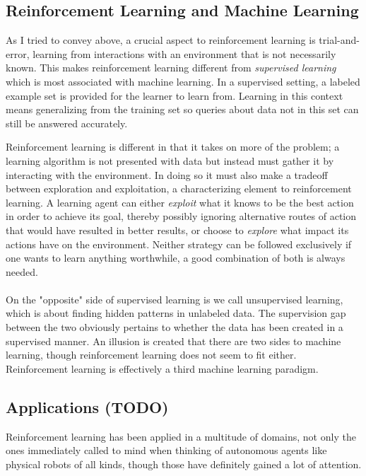 \subsection{Reinforcement Learning and Machine Learning}
As I tried to convey above,
a crucial aspect to reinforcement learning
is trial-and-error, learning from interactions
with an environment that is not necessarily known.
This makes reinforcement learning different from
\textit{supervised learning}
which is most associated with machine learning.
In a supervised setting,
a labeled example set is provided
for the learner to learn from.
Learning in this context means generalizing from the training set
so queries about data not in this set
can still be answered accurately.

Reinforcement learning is different
in that it takes on more of the problem;
a learning algorithm is not presented with data
but instead must gather it by interacting with the environment.
In doing so it must also make a tradeoff between exploration and exploitation,
a characterizing element to reinforcement learning.
A learning agent can either \textit{exploit}
what it knows to be the best action in order to achieve its goal,
thereby possibly ignoring alternative routes of action
that would have resulted in better results,
or choose to \textit{explore}
what impact its actions have on the environment.
Neither strategy can be followed exclusively
if one wants to learn anything worthwhile,
a good combination of both is always needed.

\paragraph{}
On the "opposite" side of supervised learning
is we call unsupervised learning,
which is about finding hidden patterns in unlabeled data.
The supervision gap between the two obviously pertains
to whether the data has been created in a supervised manner.
An illusion is created that there are two sides to machine learning,
though reinforcement learning does not seem to fit either.
Reinforcement learning is effectively a third machine learning paradigm.

\subsection{Applications (TODO)}
Reinforcement learning has been applied in a multitude of domains,
not only the ones immediately called to mind when thinking
of autonomous agents like physical robots of all kinds,
though those have definitely gained a lot of attention.

